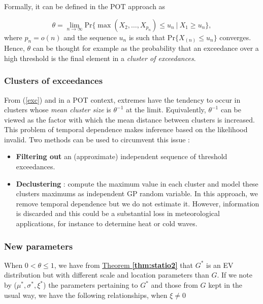 Formally, it can be defined in the POT approach as

\begin{equation}\label{exc}
\theta=\displaystyle{\lim_{n \to \infty}}\text{Pr}\Big\{\max(X_2,\dots,X_{p_n})\leq u_n\ | \ X_1\geq u_n\Big\},
\end{equation}
where $p_n=o(n)$ and the sequence $u_n$ is such that Pr$\big\{X_{(n)} \leq u_n\big\}$ converges.
Hence, $\theta$ can be thought for example as the probability that an exceedance over a high threshold is the final element in a \textit{cluster of exceedances}.%


\subsubsection*{Clusters of exceedances}

From (\ref{exc}) and in a POT context, extremes have the tendency to occur in clusters whose \emph{mean cluster size} is $\theta^{-1}$ at the limit. Equivalently, $\theta^{-1}$ can be viewed as the factor with which the mean distance between clusters is increased.
This problem of temporal dependence makes inference based on the likelihood invalid.
Two methods can be used to circumvent this issue : 

\begin{itemize}
	\item \textbf{Filtering out} an (approximate) independent sequence of threshold exceedances.
	\item \textbf{Declustering} : compute the maximum value in each cluster and model these clusters maximums as independent GP random variable. In this approach, we remove temporal dependence but we do not estimate it.
	However, information is discarded and this could be a substantial loss in meteorological applications, for instance to determine heat or cold waves.
\end{itemize}


\subsubsection*{New parameters}
 When $0<\theta\leq 1$, we have from \hyperref[thm:statio2]{Theorem \textbf{\ref{thm:statio2}}} that $G^*$ is an EV distribution but with different scale and location parameters than $G$. If we note by ($\mu^*,\sigma^*,\xi^*$) the parameters pertaining to $G^*$ and those from $G$ kept in the usual way, we have the following relationships, when $\xi\neq 0$

